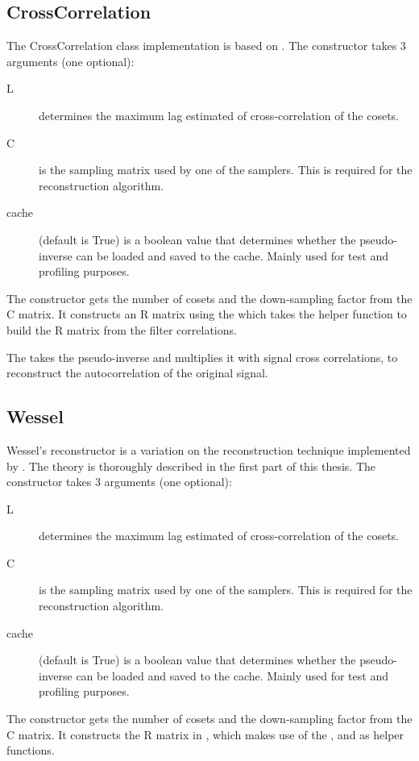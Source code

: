 \documentclass[a4paper, openany, oneside]{memoir}
\begin{document}
\subsection{CrossCorrelation}
\label{sub:crosscorrelation}
The CrossCorrelation class implementation is based on \cite{ariananda2012compressive}. The constructor takes 3 arguments (one optional):
\begin{description}
    \item[L] determines the maximum lag estimated of cross-correlation of the cosets.
    \item[C] is the sampling matrix used by one of the samplers. This is required for the reconstruction algorithm.
    \item[cache] (default is True) is a boolean value that determines whether the pseudo-inverse can be loaded and saved to the cache. Mainly used for test and profiling purposes.
\end{description}
The constructor gets the number of cosets and the down-sampling factor from the C matrix. It constructs an R matrix using the  which takes the  helper function to build the R matrix from the filter correlations.

The  takes the pseudo-inverse and multiplies it with signal cross correlations, to reconstruct the autocorrelation of the original signal.

\subsection{Wessel}
\label{sub:wessel}
Wessel's reconstructor is a variation on the reconstruction technique implemented by . The theory is thoroughly described in the first part of this thesis. The constructor takes 3 arguments (one optional):
\begin{description}
    \item[L] determines the maximum lag estimated of cross-correlation of the cosets.
    \item[C] is the sampling matrix used by one of the samplers. This is required for the reconstruction algorithm.
    \item[cache] (default is True) is a boolean value that determines whether the pseudo-inverse can be loaded and saved to the cache. Mainly used for test and profiling purposes.
\end{description}
The constructor gets the number of cosets and the down-sampling factor from the C matrix. It constructs the R matrix in , which makes use of the ,  and  as helper functions.
\end{document}

